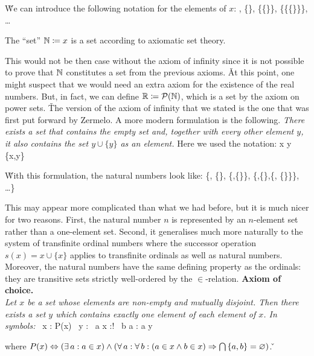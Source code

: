 \v

We can introduce the following notation for the elements of $x$:
 \coloneqq \vn,  \coloneqq \{\vn\}, \coloneqq \{\{\vn\}\},  \coloneqq \{\{\{\vn\}\}\}, \quad
\ldots
\ese

\vspace{-10pt}

\bt[]
The ``set'' $\mathbb{N}\coloneqq x$\index{$\N$} is a set according to axiomatic set theory.
\et

This would not be then case without the axiom of infinity since it is not possible to prove that $\N$ constitutes a
set from the previous axioms. \v

At this point, one might suspect that we would need an extra axiom for the existence of the real numbers. But, in
fact, we can define $\mathbb{R} \coloneqq \mathcal{P}(\mathbb{N})$, which is a set by the axiom on power sets. \v

The version of the axiom of infinity that we stated is the one that was first put forward by Zermelo. A more modern
formulation is the following. \emph{There exists a set that contains the empty set and, together with every other
element $y$, it also contains the set $y\cup\{y\}$ as an element.} Here we used the notation:
\bse
x \cup y \coloneqq \bigcup \, \{x,y\}
\ese

\v

With this formulation, the natural numbers look like:
\bse
\N \coloneqq \{\vn, \{\vn\}, \{\vn,\{\vn\}\}, \{\vn,\{\vn\},\{\vn, \{\vn\}\}\}, \ldots \}
\ese

This may appear more complicated than what we had before, but it is much nicer for two reasons. First, the natural
number $n$ is represented by an $n$-element set rather than a one-element set. Second, it generalises much more
naturally to the system of transfinite ordinal numbers where the successor operation $s(x)=x\cup\{x\}$ applies to
transfinite ordinals as well as natural numbers. Moreover, the natural numbers have the same defining property as the
ordinals: they are transitive sets strictly well-ordered by the $\in$-relation. \v

\textbf{Axiom of choice.}\\
\emph{Let $x$ be a set whose elements are non-empty and mutually disjoint. Then there exists a set $y$ which contains
exactly one element of each element of $x$. In symbols:}
\bse
\forall \, x : P(x) \imp \exists \, y : \forall \, a \in x :\exists! \, b \in a : a \in y
\ese

where $P(x) \Leftrightarrow (\exists \,a : a \in x) \land \left(\forall \, a : \forall \, b : (a\in x \land b \in x) \Rightarrow
\bigcap \, \{a,b\} = \varnothing \right)$. \v

